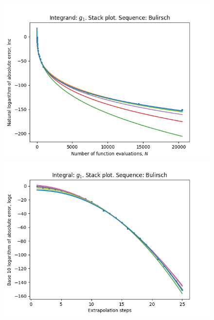\begin{figure}[H]
\centering
\begin{minipage}{0.45\textwidth}
\centering
\includegraphics[scale=0.45]{../results/romberg_plots/g_one_hp_bulirsch_stack.png}
\end{minipage}
\begin{minipage}{0.45\textwidth}
\centering
\includegraphics[scale=0.45]{../results/romberg_plots/g_one_hp_bulirsch_steps_stack.png}
\end{minipage}
\end{figure}

